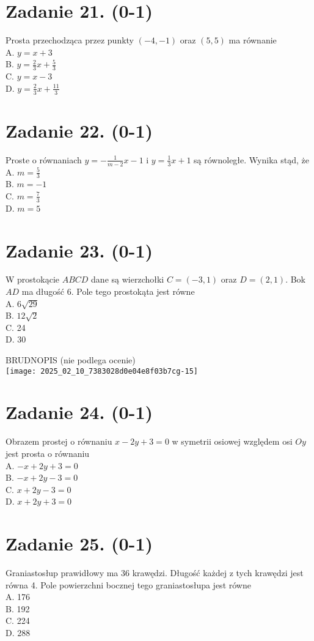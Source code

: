 \documentclass[10pt]{article}
\begin{document}
\section*{Zadanie 21. (0-1)}
Prosta przechodząca przez punkty \((-4,-1)\) oraz \((5,5)\) ma równanie\\
A. \(y=x+3\)\\
B. \(y=\frac{2}{3} x+\frac{5}{3}\)\\
C. \(y=x-3\)\\
D. \(y=\frac{2}{3} x+\frac{11}{3}\)

\section*{Zadanie 22. (0-1)}
Proste o równaniach \(y=-\frac{1}{m-2} x-1\) i \(y=\frac{1}{3} x+1\) są równoległe. Wynika stąd, że\\
A. \(m=\frac{5}{3}\)\\
B. \(m=-1\)\\
C. \(m=\frac{7}{3}\)\\
D. \(m=5\)

\section*{Zadanie 23. (0-1)}
W prostokącie \(A B C D\) dane są wierzchołki \(C=(-3,1)\) oraz \(D=(2,1)\). Bok \(A D\) ma długość 6. Pole tego prostokąta jest równe\\
A. \(6 \sqrt{29}\)\\
B. \(12 \sqrt{2}\)\\
C. 24\\
D. 30

BRUDNOPIS (nie podlega ocenie)\\
\texttt{[image: 2025\_02\_10\_7383028d0e04e8f03b7cg-15]}

\section*{Zadanie 24. (0-1)}
Obrazem prostej o równaniu \(x-2 y+3=0\) w symetrii osiowej względem osi \(O y\) jest prosta o równaniu\\
A. \(-x+2 y+3=0\)\\
B. \(-x+2 y-3=0\)\\
C. \(x+2 y-3=0\)\\
D. \(x+2 y+3=0\)

\section*{Zadanie 25. (0-1)}
Graniastosłup prawidłowy ma 36 krawędzi. Długość każdej z tych krawędzi jest równa 4. Pole powierzchni bocznej tego graniastosłupa jest równe\\
A. 176\\
B. 192\\
C. 224\\
D. 288
\end{document}
